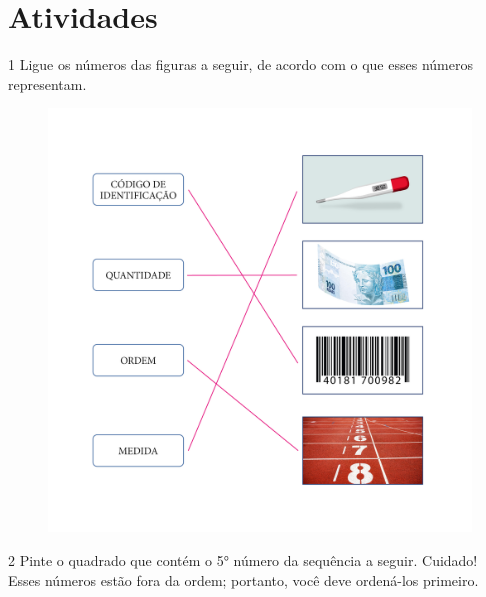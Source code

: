

\pagebreak
\section*{Atividades}

\num{1} Ligue os números das figuras a seguir, de acordo com o que esses números representam.


\begin{figure}[htpb!]
\centering
\includegraphics[width=.8\textwidth]{./media/image3_prof.png}
\end{figure}


\num{2} Pinte o quadrado que contém o 5° número da sequência a seguir.
Cuidado! Esses números estão fora da ordem; portanto, você deve
ordená-los primeiro.

